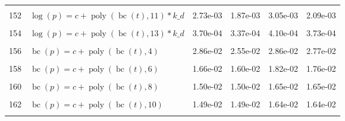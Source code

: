 \documentclass[12pt,a4paper]{article}
\DeclareMathOperator{\bc}{bc}
\DeclareMathOperator{\poly}{poly}
\begin{document}
\begin{longtable}[t]{ll>{\raggedleft\arraybackslash}p{2cm}>{\raggedleft\arraybackslash}p{2cm}>{\raggedleft\arraybackslash}p{2cm}>{\raggedleft\arraybackslash}p{2cm}}
\cellcolor{gray!6}{151} & \cellcolor{gray!6}{$\log(p) = c + \poly\left( \bc(t), 10 \right) * k\_d$} & \cellcolor{gray!6}{1.52e-02} & \cellcolor{gray!6}{6.29e-03} & \cellcolor{gray!6}{8.53e-03} & \cellcolor{gray!6}{7.00e-03}\\
152 & $\log(p) = c + \poly\left( \bc(t), 11 \right) * k\_d$ & 2.73e-03 & 1.87e-03 & 3.05e-03 & 2.09e-03\\
\cellcolor{gray!6}{153} & \cellcolor{gray!6}{$\log(p) = c + \poly\left( \bc(t), 12 \right) * k\_d$} & \cellcolor{gray!6}{6.90e-04} & \cellcolor{gray!6}{6.23e-04} & \cellcolor{gray!6}{7.67e-04} & \cellcolor{gray!6}{6.92e-04}\\
154 & $\log(p) = c + \poly\left( \bc(t), 13 \right) * k\_d$ & 3.70e-04 & 3.37e-04 & 4.10e-04 & 3.73e-04\\
\cellcolor{gray!6}{155} & \cellcolor{gray!6}{$\bc(p) = c + \poly\left( \bc(t), 3 \right)$} & \cellcolor{gray!6}{3.85e-02} & \cellcolor{gray!6}{2.32e-02} & \cellcolor{gray!6}{2.58e-02} & \cellcolor{gray!6}{2.50e-02}\\
156 & $\bc(p) = c + \poly\left( \bc(t), 4 \right)$ & 2.86e-02 & 2.55e-02 & 2.86e-02 & 2.77e-02\\
\cellcolor{gray!6}{157} & \cellcolor{gray!6}{$\bc(p) = c + \poly\left( \bc(t), 5 \right)$} & \cellcolor{gray!6}{1.69e-02} & \cellcolor{gray!6}{1.69e-02} & \cellcolor{gray!6}{1.81e-02} & \cellcolor{gray!6}{1.81e-02}\\
158 & $\bc(p) = c + \poly\left( \bc(t), 6 \right)$ & 1.66e-02 & 1.60e-02 & 1.82e-02 & 1.76e-02\\
\cellcolor{gray!6}{159} & \cellcolor{gray!6}{$\bc(p) = c + \poly\left( \bc(t), 7 \right)$} & \cellcolor{gray!6}{1.55e-02} & \cellcolor{gray!6}{1.52e-02} & \cellcolor{gray!6}{1.67e-02} & \cellcolor{gray!6}{1.67e-02}\\
160 & $\bc(p) = c + \poly\left( \bc(t), 8 \right)$ & 1.50e-02 & 1.50e-02 & 1.65e-02 & 1.65e-02\\
\cellcolor{gray!6}{161} & \cellcolor{gray!6}{$\bc(p) = c + \poly\left( \bc(t), 9 \right)$} & \cellcolor{gray!6}{1.50e-02} & \cellcolor{gray!6}{1.50e-02} & \cellcolor{gray!6}{1.65e-02} & \cellcolor{gray!6}{1.65e-02}\\
162 & $\bc(p) = c + \poly\left( \bc(t), 10 \right)$ & 1.49e-02 & 1.49e-02 & 1.64e-02 & 1.64e-02\\
\cellcolor{gray!6}{163} & \cellcolor{gray!6}{$\bc(p) = c + \poly\left( \bc(t), 11 \right)$} & \cellcolor{gray!6}{1.49e-02} & \cellcolor{gray!6}{1.49e-02} & \cellcolor{gray!6}{1.64e-02} & \cellcolor{gray!6}{1.64e-02}\\

\end{longtable}
\end{document}
